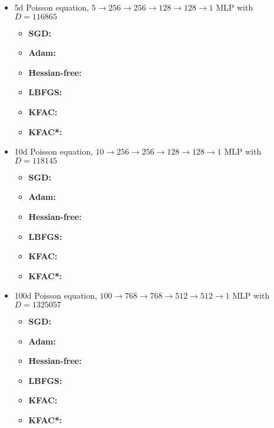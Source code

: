 \begin{itemize}

\item 5d Poisson equation, $5 \to 256 \to 256 \to 128 \to 128 \to 1$ MLP with $D=\num{116865}$
  \begin{itemize}
    \def\pathToRuns{../kfac_pinns_exp/exp26_poisson5d_mlp_tanh_256_bayes/tex}
  \item \textbf{SGD:} 
  \item \textbf{Adam:} 
  \item \textbf{Hessian-free:} 
  \item \textbf{LBFGS:} 
  \item \textbf{KFAC:} 
  \item \textbf{KFAC*:} 
  \end{itemize}

\item 10d Poisson equation, $10 \to 256 \to 256 \to 128 \to 128 \to 1$ MLP with $D=\num{118145}$
  \begin{itemize}
    \def\pathToRuns{../kfac_pinns_exp/exp32_poisson10d_mlp_tanh_256_bayes/tex}
  \item \textbf{SGD:} 
  \item \textbf{Adam:} 
  \item \textbf{Hessian-free:} 
  \item \textbf{LBFGS:} 
  \item \textbf{KFAC:} 
  \item \textbf{KFAC*:} 
  \end{itemize}

\item 100d Poisson equation, $100 \to 768 \to 768 \to 512 \to 512 \to 1$ MLP with $D=\num{1325057}$
  \begin{itemize}
    \def\pathToRuns{../kfac_pinns_exp/exp14_poisson_100d_weinan/tex}
  \item \textbf{SGD:} 
  \item \textbf{Adam:} 
  \item \textbf{Hessian-free:} 
  \item \textbf{LBFGS:} 
  \item \textbf{KFAC:} 
  \item \textbf{KFAC*:} 
  \end{itemize}
\end{itemize}

